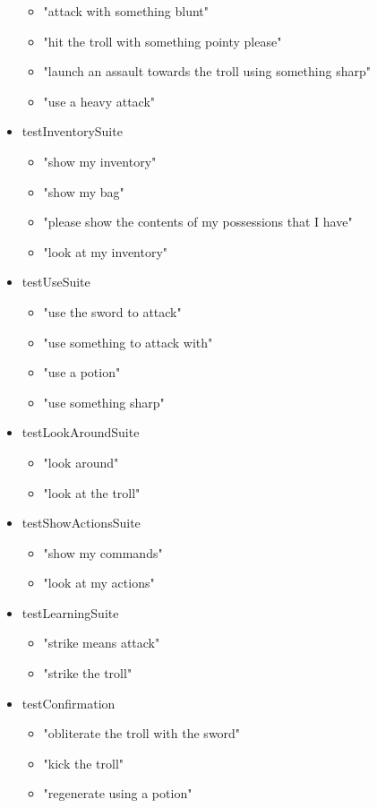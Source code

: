 \documentclass[11pt]{article}
\begin{document}
\begin{scriptsize}
\begin{itemize}
\begin{itemize}
	\item "attack with something blunt"
	\item "hit the troll with something pointy please"
	\item "launch an assault towards the troll using something sharp"
	\item "use a heavy attack"
	\end{itemize}
\item testInventorySuite
	\begin{itemize}
	\item "show my inventory"
	\item "show my bag"
	\item "please show the contents of my possessions that I have"
	\item "look at my inventory"
	\end{itemize}
\item testUseSuite
	\begin{itemize}
	\item "use the sword to attack"
	\item "use something to attack with"
	\item "use a potion"
	\item "use something sharp"
	\end{itemize}
\item testLookAroundSuite
	\begin{itemize}
	\item "look around"
	\item "look at the troll"
	\end{itemize}
\item testShowActionsSuite
	\begin{itemize}
	\item "show my commands"
	\item "look at my actions"
	\end{itemize}
\item testLearningSuite
	\begin{itemize}
	\item "strike means attack"
	\item "strike the troll"
	\end{itemize}
\item testConfirmation
	\begin{itemize}
	\item "obliterate the troll with the sword"
	\item "kick the troll"
	\item "regenerate using a potion"

\end{itemize}
\end{itemize}
\end{scriptsize}
\end{document}
